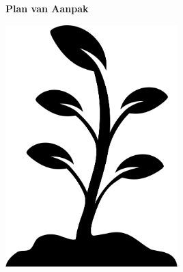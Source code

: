 \begin{titlepage}
   \begin{center}
       \vspace*{1cm}

		\Huge
		\textbf{Plan van Aanpak}

		\vspace{0.5cm}
		
		\LARGE
		\ProjectName
            
		\vspace{1.5cm}

		\textbf{\StudentName}

		\vspace{3.0cm}
		
		\includegraphics[width=0.5\textwidth]{img/Coverimage.png}
   \end{center}
\end{titlepage}
